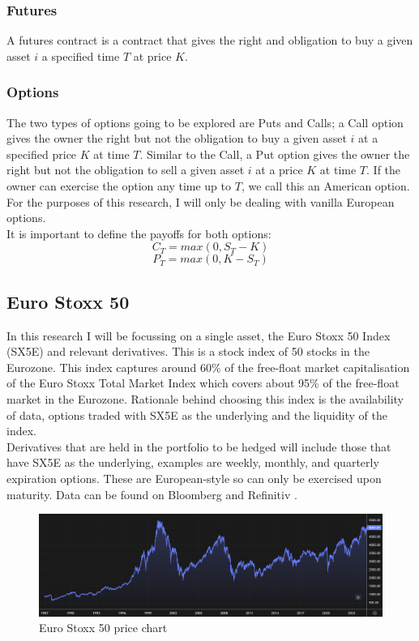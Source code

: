 \documentclass[12pt]{article}
\numberwithin{equation}{section}
\begin{document}
\subsubsection{Futures}
A futures contract is a contract that gives the right and obligation to buy a 
given asset $i$ a specified time $T$ at price $K$. 
\subsubsection{Options}
The two types of options going to be explored are Puts and Calls; a Call option 
gives the owner the right but not the obligation to buy a given asset $i$ at 
a specified price $K$ at time $T$. Similar to the Call, a Put option gives the 
owner the right but not the obligation to sell a given asset $i$ at a price $K$ 
at time $T$. If the owner can exercise the option any time up to $T$, we call 
this an American option. For the purposes of this research, I will only be 
dealing with vanilla European options.\\ 
It is important to define the payoffs for both options: 
\begin{equation}
C_T = max(0,S_T-K)
\end{equation}
\begin{equation}
P_T = max(0,K-S_T)
\end{equation}



\subsection{Euro Stoxx 50}
In this research I will be focussing on a single asset, the Euro Stoxx 50 Index
(SX5E) and relevant derivatives. This is a stock index of 50 stocks in the Eurozone. 
This index captures around 60\% of the free-float market capitalisation of the 
Euro Stoxx Total Market Index which covers about 95\% of the free-float market 
in the Eurozone\autocite{a2021_euro}. Rationale behind choosing this index is the availability of data,
options traded with SX5E as the underlying and the liquidity of the index.
\\
Derivatives that are held in the portfolio to be hedged will include those that 
have SX5E as the underlying, examples are weekly, monthly, and quarterly
expiration options. These are European-style so can only be exercised upon 
maturity. Data can be found on Bloomberg\autocite{bloomberg_2023_bloomberg} and Refinitiv
\autocite{lseg}.
\begin{figure}[h]
    \centering
    \includegraphics[scale=0.35]{sx5e.png}
    \caption{Euro Stoxx 50 price chart}
\end{figure}
\end{document}
